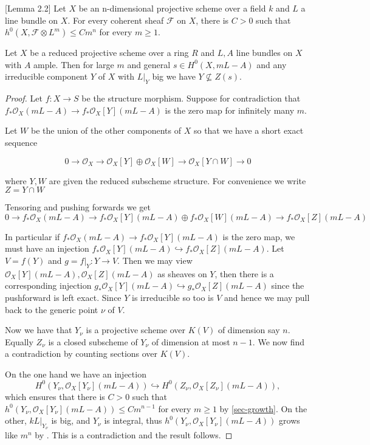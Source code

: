 \documentclass[a4paper,12pt]{book}
\newcommand{\F}{\mathcal{F}}
\newcommand{\ox}{\mathcal{O}_{X}}
\begin{document}
\begin{lemma}\cite{cascini2014augmented}[Lemma 2.2]\label{sec-growth}
	Let $X$ be an n-dimensional projective scheme over a field $k$ and $L$ a line bundle on $X$.
	For every coherent sheaf $\F$ on $X$, there is $C > 0$ such that $h^{0}(X, \F\otimes L^{m}) \leq C m^{n}$ for every $m \geq 1$.
\end{lemma}

\begin{lemma}\label{bigsecs}
	Let $X$ be a reduced projective scheme over a ring $R$ and $L,A$ line bundles on $X$ with $A$ ample. Then for large $m$ and general $s \in H^{0}(X,mL-A)$ and any irreducible component $Y$ of $X$ with $L|_{Y}$ big we have $Y \not \subseteq Z(s)$.
\end{lemma}

\begin{proof}
	
	Let $f:X \to S$ be the structure morphism. Suppose for contradiction that $f_{*}\ox(mL-A) \to f_{*}\ox[Y](mL-A)$ is the zero map for infinitely many $m$.
	
	Let $W$ be the union of the other components of $X$ so that we have a short exact sequence 
	
	\[0 \to \ox \to \ox[Y]\oplus \ox[W] \to \ox[Y\cap W] \to 0\]
	
	where $Y,W$ are given the reduced subscheme structure. For convenience we write $Z=Y\cap W$
	
	Tensoring and pushing forwards we get 
	\[0 \to f_{*}\ox(mL-A)\to f_{*}\ox[Y](mL-A)\oplus f_{*}\ox[W](mL-A) \to f_{*}\ox[Z](mL-A) \]
	
	In particular if $f_{*}\ox(mL-A) \to f_{*}\ox[Y](mL-A)$ is the zero map, we must have an injection $ f_{*}\ox[Y](mL-A) \hookrightarrow f_{*}\ox[Z](mL-A)$. Let $V=f(Y)$ and $g=f|_{Y}:Y \to V$. Then we may view $\ox[Y](mL-A), \ox[Z](mL-A)$ as sheaves on $Y$, then there is a corresponding injection $g_{*}\ox[Y](mL-A) \hookrightarrow g_{*}\ox[Z](mL-A)$ since the pushforward is left exact. Since $Y$ is irreducible so too is $V$ and hence we may pull back to the generic point $\nu$ of $V$.
	
	Now we have that $Y_{\nu}$ is a projective scheme over $K(V)$ of dimension say $n$. Equally $Z_{\nu}$ is a closed subscheme of $Y_{\nu}$ of dimension at most $n-1$. We now find a contradiction by counting sections over $K(V)$.
	
	On the one hand we have an injection $$H^{0}(Y_{\nu},\ox[Y_{\nu}](mL-A)) \hookrightarrow H^{0}(Z_{\nu}, \ox[Z_{\nu}](mL-A)),$$ which ensures that there is $C > 0$ such that $h^{0}(Y_{\nu}, \ox[Y_{\nu}](mL-A)) \leq C m^{n-1}$ for every $m \geq 1$ by \autoref{sec-growth}. On the other, $kL|_{Y_{\nu}}$ is big, and $Y_{\nu}$ is integral, thus $h^{0}(Y_{\nu}, \ox[Y_{\nu}](mL-A))$ grows like $m^{n}$ by \cite[Lemma 4.2]{birkar2017augmented}. This is a contradiction and the result follows.		
\end{proof}
\end{document}
